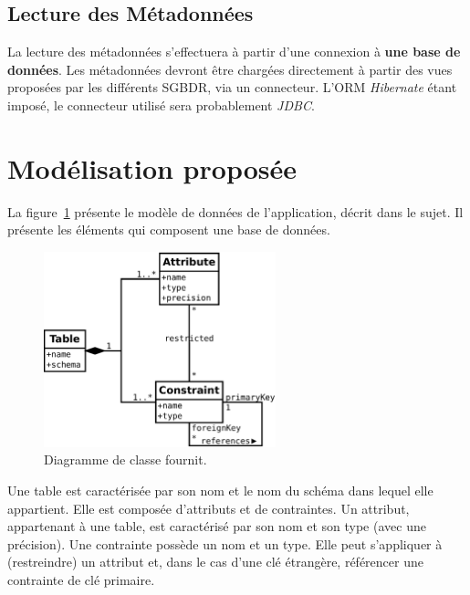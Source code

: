 	\subsection{Lecture des Métadonnées}
	La lecture des métadonnées s'effectuera à partir d'une connexion à \textbf{une base de données}. Les métadonnées devront être chargées directement à partir des vues proposées par les différents SGBDR, via un connecteur. L'ORM \emph{Hibernate} étant imposé, le connecteur utilisé sera probablement \emph{JDBC}.

\section{Modélisation proposée}
\label{section:modelisation_proposee}

La figure~\ref{figure:diag_classe_fournit} présente le modèle de données de l'application, décrit dans le sujet. Il présente les éléments qui composent une base de données.

\begin{figure}[H]
\centering
\includegraphics[width=0.6\textwidth]{files/diag_class_origine}
\caption{Diagramme de classe fournit.}
\label{figure:diag_classe_fournit}
\end{figure}

Une table est caractérisée par son nom et le nom du schéma dans lequel elle appartient. Elle est composée d'attributs et de contraintes. Un attribut, appartenant à une table, est caractérisé par son nom et son type (avec une précision). Une contrainte possède un nom et un type. Elle peut s'appliquer à (restreindre) un attribut et, dans le cas d'une clé étrangère, référencer une contrainte de clé primaire.
